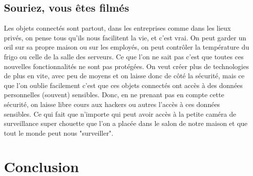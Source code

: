 \documentclass[a4paper]{report}
\begin{document}
	\subsection{Souriez, vous êtes filmés}
	Les objets connectés sont partout, dans les entreprises comme dans les lieux privés, on pense tous qu'ils nous facilitent la vie, 
	et c'est vrai. On peut garder un œil sur sa propre maison ou sur les employés, on peut contrôler la température du frigo ou celle 
	de la salle des serveurs. Ce que l'on ne sait pas c'est que toutes ces nouvelles fonctionnalités ne sont pas protégées. On veut créer 
	plus de technologies de plus en vite, avec peu de moyens et on laisse donc de côté la sécurité, mais ce que l'on oublie facilement 
	c'est que ces objets connectés ont accès à des données personnelles (souvent) sensibles. Donc, en ne prenant pas en compte cette sécurité,
	on laisse libre cours aux hackers ou autres l'accès à ces données sensibles. Ce qui fait que n'importe qui peut avoir accès à la petite
	caméra de surveillance super chouette que l'on a placée dans le salon de notre maison et que tout le monde peut nous "surveiller".  
	
	\section{Conclusion}
\end{document}
